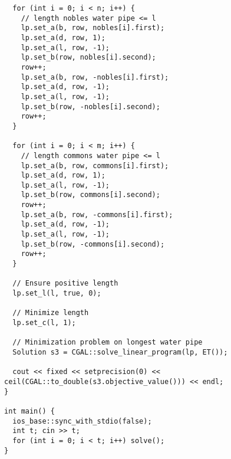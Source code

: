 \documentclass[12pt,letterpaper]{article}
\begin{document}
\begin{verbatim}
  for (int i = 0; i < n; i++) {
    // length nobles water pipe <= l
    lp.set_a(b, row, nobles[i].first);
    lp.set_a(d, row, 1);
    lp.set_a(l, row, -1);
    lp.set_b(row, nobles[i].second);
    row++;
    lp.set_a(b, row, -nobles[i].first);
    lp.set_a(d, row, -1);
    lp.set_a(l, row, -1);
    lp.set_b(row, -nobles[i].second);
    row++;
  }
  
  for (int i = 0; i < m; i++) {
    // length commons water pipe <= l
    lp.set_a(b, row, commons[i].first);
    lp.set_a(d, row, 1);
    lp.set_a(l, row, -1);
    lp.set_b(row, commons[i].second);
    row++;
    lp.set_a(b, row, -commons[i].first);
    lp.set_a(d, row, -1);
    lp.set_a(l, row, -1);
    lp.set_b(row, -commons[i].second);
    row++;
  }
  
  // Ensure positive length 
  lp.set_l(l, true, 0);
  
  // Minimize length
  lp.set_c(l, 1);
  
  // Minimization problem on longest water pipe
  Solution s3 = CGAL::solve_linear_program(lp, ET());
  
  cout << fixed << setprecision(0) << ceil(CGAL::to_double(s3.objective_value())) << endl;
}

int main() {
  ios_base::sync_with_stdio(false);
  int t; cin >> t;
  for (int i = 0; i < t; i++) solve();
}
\end{verbatim}
\end{document}
